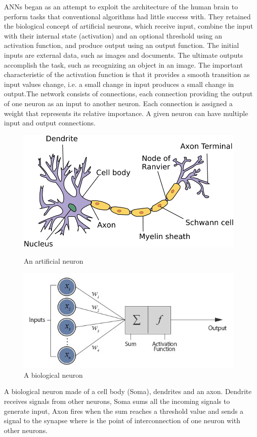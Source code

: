 \documentclass[10pt]{SelfArx} %
\begin{document}
ANNs began as an attempt to exploit the architecture of the human brain to perform tasks that conventional algorithms had little success with. They retained the biological concept of artificial neurons, which receive input, combine the input with their internal state (activation) and an optional threshold using an activation function, and produce output using an output function. The initial inputs are external data, such as images and documents. The ultimate outputs accomplish the task, such as recognizing an object in an image. The important characteristic of the activation function is that it provides a smooth transition as input values change, i.e. a small change in input produces a small change in output.The network consists of connections, each connection providing the output of one neuron as an input to another neuron. Each connection is assigned a weight that represents its relative importance. A given neuron can have multiple input and output connections.
\begin{figure}\centering
			\includegraphics[width=\linewidth]{img/neuron}
	\caption{An artificial neuron}
		\includegraphics[width=\linewidth]{img/aneuron}
	\caption{A biological neuron}	
\end{figure}
A biological neuron made of a cell body (Soma), dendrites and an axon. Dendrite receives signals from other neurons, Soma sums all the incoming signals to generate input, Axon fires when the sum reaches a threshold value and sends a signal to the synapse where is the point of interconnection of one neuron with other neurons.
\end{document}
